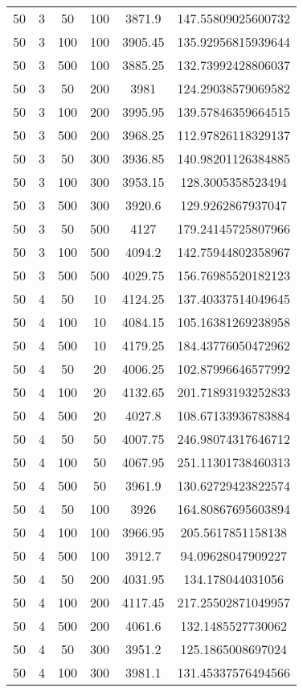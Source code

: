 {\begin{longtabu}{S
S
S
S
S[round-mode=places, round-precision=0]
S[round-mode=places, round-precision=0]}
50 & 3 & 50 & 100 & 3871.9 & 147.55809025600732 \\
50 & 3 & 100 & 100 & 3905.45 & 135.92956815939644 \\
50 & 3 & 500 & 100 & 3885.25 & 132.73992428806037 \\
50 & 3 & 50 & 200 & 3981 & 124.29038579069582 \\
50 & 3 & 100 & 200 & 3995.95 & 139.57846359664515 \\
50 & 3 & 500 & 200 & 3968.25 & 112.97826118329137 \\
50 & 3 & 50 & 300 & 3936.85 & 140.98201126384885 \\
50 & 3 & 100 & 300 & 3953.15 & 128.3005358523494 \\
50 & 3 & 500 & 300 & 3920.6 & 129.9262867937047 \\
50 & 3 & 50 & 500 & 4127 & 179.24145725807966 \\
50 & 3 & 100 & 500 & 4094.2 & 142.75944802358967 \\
50 & 3 & 500 & 500 & 4029.75 & 156.76985520182123 \\
50 & 4 & 50 & 10 & 4124.25 & 137.40337514049645 \\
50 & 4 & 100 & 10 & 4084.15 & 105.16381269238958 \\
50 & 4 & 500 & 10 & 4179.25 & 184.43776050472962 \\
50 & 4 & 50 & 20 & 4006.25 & 102.87996646577992 \\
50 & 4 & 100 & 20 & 4132.65 & 201.71893193252833 \\
50 & 4 & 500 & 20 & 4027.8 & 108.67133936783884 \\
50 & 4 & 50 & 50 & 4007.75 & 246.98074317646712 \\
50 & 4 & 100 & 50 & 4067.95 & 251.11301738460313 \\
50 & 4 & 500 & 50 & 3961.9 & 130.62729423822574 \\
50 & 4 & 50 & 100 & 3926 & 164.80867695603894 \\
50 & 4 & 100 & 100 & 3966.95 & 205.5617851158138 \\
50 & 4 & 500 & 100 & 3912.7 & 94.09628047909227 \\
50 & 4 & 50 & 200 & 4031.95 & 134.178044031056 \\
50 & 4 & 100 & 200 & 4117.45 & 217.25502871049957 \\
50 & 4 & 500 & 200 & 4061.6 & 132.1485527730062 \\
50 & 4 & 50 & 300 & 3951.2 & 125.1865008697024 \\
50 & 4 & 100 & 300 & 3981.1 & 131.45337576494566 \\

\end{longtabu}}
